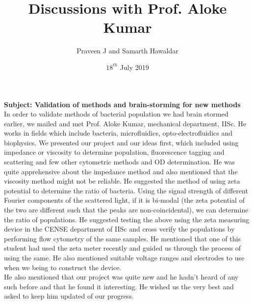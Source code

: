 \documentclass [a4paper,11pt]{article}
\begin{document}
\title{Discussions with Prof. Aloke Kumar}
\author{Praveen J and Samarth Hawaldar}
\date{$18^{th}$ July 2019}
\maketitle
\textbf{Subject: Validation of methods and brain-storming for new methods}\\
In order to validate methods of bacterial population we had brain stormed earlier, we mailed and met Prof. Aloke Kumar, mechanical department, IISc. He works in fields which include bacteria, microfluidics, opto-electrofluidics and biophysics. We presented our project and our ideas first, which included using impedance or viscosity to determine population, fluorescence tagging and scattering and few other cytometric methods and OD determination. He was quite apprehensive about the impedance method and also mentioned that the viscosity method might not be reliable. He suggested the method of using zeta potential to determine the ratio of bacteria. Using the signal strength of different Fourier components of the scattered light, if it is bi-modal (the zeta potential of the two are different such that the peaks are non-coincidental), we can determine the ratio of populations. He suggested testing the above using the zeta measuring device in the CENSE department of IISc and cross verify the populations by performing flow cytometry of the same samples. He mentioned that one of this student had used the zeta meter recently and guided us through the process of using the same. He also mentioned suitable voltage ranges and electrodes to use when we being to construct the device.\\
He also mentioned that our project was quite new and he hadn't heard of any such before and that he found it interesting. He wished us the very best and asked to keep him updated of our progress.
\end{document}
